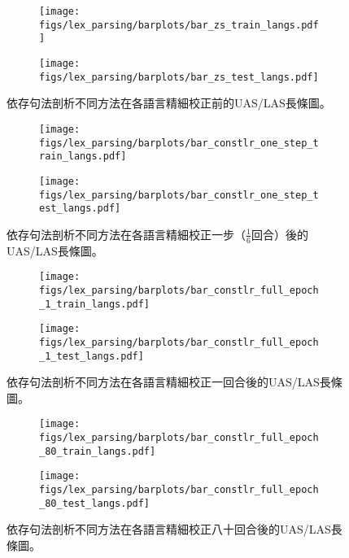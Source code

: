\begin{figure}[htbp]
    \centering
    \begin{subfigure}[t]{0.8\textwidth}
        \centering
        \texttt{[image: figs/lex\_parsing/barplots/bar\_zs\_train\_langs.pdf]}
    \end{subfigure}
    \vspace{-12pt}
    \begin{subfigure}[t]{0.8\textwidth}
        \centering
        \texttt{[image: figs/lex\_parsing/barplots/bar\_zs\_test\_langs.pdf]}
    \end{subfigure}
    \caption{依存句法剖析不同方法在各語言精細校正前的UAS/LAS長條圖。}
    \label{fig:lex_bar_zs}
\end{figure}
\begin{figure}[htbp]
    \centering
    \begin{subfigure}[t]{0.8\textwidth}
        \centering
        \texttt{[image: figs/lex\_parsing/barplots/bar\_constlr\_one\_step\_train\_langs.pdf]}
    \end{subfigure}
    \vspace{-12pt}
    \begin{subfigure}[t]{0.8\textwidth}
        \centering
        \texttt{[image: figs/lex\_parsing/barplots/bar\_constlr\_one\_step\_test\_langs.pdf]}
    \end{subfigure}
    \caption{依存句法剖析不同方法在各語言精細校正一步（$\frac{1}{6}$回合）後的UAS/LAS長條圖。}
    \label{fig:lex_bar_one_step}
\end{figure}
\begin{figure}[htbp]
    \centering
    \begin{subfigure}[t]{0.8\textwidth}
        \centering
        \texttt{[image: figs/lex\_parsing/barplots/bar\_constlr\_full\_epoch\_1\_train\_langs.pdf]}
    \end{subfigure}
    \vspace{-12pt}
    \begin{subfigure}[t]{0.8\textwidth}
        \centering
        \texttt{[image: figs/lex\_parsing/barplots/bar\_constlr\_full\_epoch\_1\_test\_langs.pdf]}
    \end{subfigure}
    \caption{依存句法剖析不同方法在各語言精細校正一回合後的UAS/LAS長條圖。}
    \label{fig:lex_bar_full_epoch_1}
\end{figure}
\begin{figure}[htbp]
    \centering
    \begin{subfigure}[t]{0.8\textwidth}
        \centering
        \texttt{[image: figs/lex\_parsing/barplots/bar\_constlr\_full\_epoch\_80\_train\_langs.pdf]}
    \end{subfigure}
    \vspace{-12pt}
    \begin{subfigure}[t]{0.8\textwidth}
        \centering
        \texttt{[image: figs/lex\_parsing/barplots/bar\_constlr\_full\_epoch\_80\_test\_langs.pdf]}
    \end{subfigure}
    \caption{依存句法剖析不同方法在各語言精細校正八十回合後的UAS/LAS長條圖。}
    \label{fig:lex_bar_full_epoch_80}
\end{figure}
